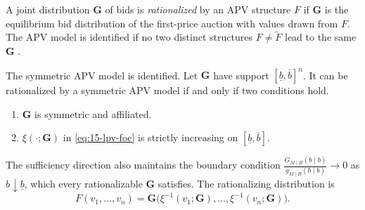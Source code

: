 \begin{definition}\label{def:15-lpv-rational}
A joint distribution $\bm G$ of bids is \emph{rationalized} by an APV structure $F$ if $\bm G$ is the
equilibrium bid distribution of the first-price auction with values drawn from $F$. The APV model is
identified if no two distinct structures $F\ne\tilde F$ lead to the same $\bm G$
\citep[Definition~1]{LiPerrigneVuong2002}.
\end{definition}

\begin{proposition}\label{prop:15-lpv}
The symmetric APV model is identified. Let $\bm G$ have support $[\underline b,\bar b]^n$. It can be
rationalized by a symmetric APV model if and only if two conditions hold.
\begin{enumerate}[label=(\roman*)]
  \item $\bm G$ is symmetric and affiliated.
  \item $\xi(\cdot;\bm G)$ in \eqref{eq:15-lpv-foc} is strictly increasing on $[\underline b,\bar b]$.
\end{enumerate}
The sufficiency direction also maintains the boundary condition
$\frac{G_{M\mid B}(b\mid b)}{g_{M\mid B}(b\mid b)}\to0$ as $b\downarrow\underline b$, which every rationalizable $\bm G$
satisfies. The rationalizing distribution is
\begin{equation}\label{eq:15-lpv-F}
  F(v_1,\dots,v_n)=\bm G\bigl(\xi^{-1}(v_1;\bm G),\dots,\xi^{-1}(v_n;\bm G)\bigr).
\end{equation}
\end{proposition}

